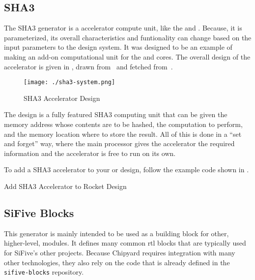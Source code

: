 \subsection{SHA3}\label{sec:SHA3_Accelerators_Generator}
\nocite{sha3Paper}
\nocite{sha3Github}
The SHA3 generator is a  \gls{accelerator} compute unit, like the  and .
Because, it is parameterized, its overall characteristics and funtionality can change based on the input parameters to the design system.
It was designed to be an example of making an add-on computational unit for the  and  cores.
The overall design of the \gls{accelerator} is given in , drawn from~\cite{sha3Paper} and fetched from~\cite{sha3Github}.

\begin{figure}[h!tbp]
  \centering
  \texttt{[image: ./sha3-system.png]}
  \caption{SHA3 Accelerator Design~\cite[p.~3]{sha3Paper}}
  \label{fig:SHA3_Accelerator_Design}
\end{figure}

The design is a fully featured SHA3 computing unit that can be given the memory address whose contents are to be hashed, the computation to perform, and the memory location where to store the result.
All of this is done in a ``set and forget'' way, where the main processor gives the \gls{accelerator} the required information and the accelerator is free to run on its own.

To add a SHA3 accelerator to your  or  design, follow the example code shown in .

\begin{listing}[h!tbp]
\caption{Add SHA3 Accelerator to Rocket Design}
\label{lst:SHA3_Accelerator_Addition}
\end{listing}

\subsection{SiFive Blocks}\label{sec:SiFive_Blocks}
\nocite{siFiveBlocksGithub}
This generator is mainly intended to be used as a building block for other, higher-level, modules.
It defines many common \gls{rtl} blocks that are typically used for SiFive's other projects.
Because Chipyard requires integration with many other technologies, they also rely on the code that is already defined in the \texttt{sifive-blocks} repository.

